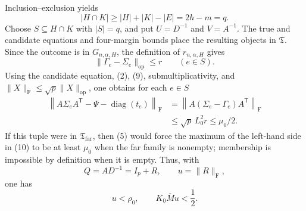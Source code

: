 Inclusion--exclusion yields
\[
|H\cap K|\geq|H|+|K|-|E|=2h-m=q.
\]
Choose \(S\subseteq H\cap K\) with \(|S|=q\), and put \(U=D^{-1}\) and \(V=A^{-1}\). The true and candidate equations and four-margin bounds place the resulting objects in \(\mathfrak T\). Since the outcome is in \(G_{n,\alpha,H}\), the definition of \(r_{n,\alpha,H}\) gives
\[
\|\Gamma_e-\Sigma_e\|_{\mathrm{op}}\leq r
\qquad(e\in S).
\tag{9}
\]
Using the candidate equation, (2), (9), submultiplicativity, and \(\|X\|_{\mathrm F}\leq\sqrt p\|X\|_{\mathrm{op}}\), one obtains for each \(e\in S\)
\[
\begin{aligned}
\left\|A\Sigma_eA^{\mathsf T}
-\Psi-\operatorname{diag}(t_e)\right\|_{\mathrm F}
&=\left\|A(\Sigma_e-\Gamma_e)A^{\mathsf T}\right\|_{\mathrm F}\\
&\leq\sqrt p\,L_0^2r
\leq\mu_0/2.
\end{aligned}
\tag{10}
\]
If this tuple were in \(\mathfrak T_{\mathrm{far}}\), then (5) would force the maximum of the left-hand side in (10) to be at least \(\mu_0\) when the far family is nonempty; membership is impossible by definition when it is empty. Thus, with
\[
Q=AD^{-1}=I_p+R,
\qquad u=\|R\|_{\mathrm F},
\]
one has
\[
u<\rho_0,
\qquad K_0\overline M u<\frac12.
\tag{11}
\]

